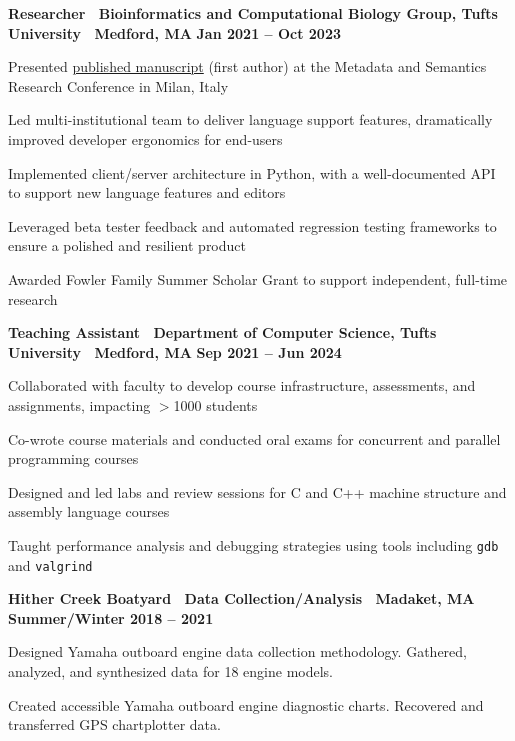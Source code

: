 \documentclass[10pt]{article}
\newenvironment{mylist}[1][]
{\itemize[nosep, wide=0pt, leftmargin=*, after=\strut]}
{\enditemize}
\begin{document}
\begin{minipage}[t]{\linewidth}
    \textbf{Researcher \textbar \ Bioinformatics and Computational Biology Group, Tufts University \textbar \ Medford, MA} \hfill \textbf{Jan 2021 -- Oct 2023}
    \begin{mylist}
    \item Presented \href{https://link.springer.com/chapter/10.1007/978-3-031-65990-4_25}{published manuscript} (first author) at the Metadata and Semantics Research Conference in Milan, Italy
        \item Led multi-institutional team to deliver language support features, dramatically improved developer ergonomics for end-users
        \item Implemented client/server architecture in Python, with a well-documented API to support new language features and editors
        \item Leveraged beta tester feedback and automated regression testing frameworks to ensure a polished and resilient product
        \item Awarded Fowler Family Summer Scholar Grant to support independent, full-time research
    \end{mylist}
\end{minipage}

\begin{minipage}[t]{\linewidth}
    \textbf{Teaching Assistant \textbar \ Department of Computer Science, Tufts University \textbar \ Medford, MA} \hfill \textbf{Sep 2021 -- Jun 2024}
    \begin{mylist} 
        \item Collaborated with faculty to develop course infrastructure, assessments, and assignments, impacting $>$1000 students
        \item Co-wrote course materials and conducted oral exams for concurrent and parallel programming courses
        \item Designed and led labs and review sessions for C and C++ machine structure and assembly language courses
        \item Taught performance analysis and debugging strategies using tools including \texttt{gdb} and \texttt{valgrind}
    \end{mylist}
\end{minipage}

\begin{minipage}[t]{\linewidth}
    \textbf{Hither Creek Boatyard \textbar \ Data Collection/Analysis \textbar \ Madaket, MA} \hfill \textbf{Summer/Winter 2018 -- 2021}
    \begin{mylist}
        \item Designed Yamaha outboard engine data collection methodology. Gathered, analyzed, and synthesized data for 18 engine models.
        \item Created accessible Yamaha outboard engine diagnostic charts. Recovered and transferred GPS chartplotter data. 
    \end{mylist}
\end{minipage}
\pagebreak
\end{document}

